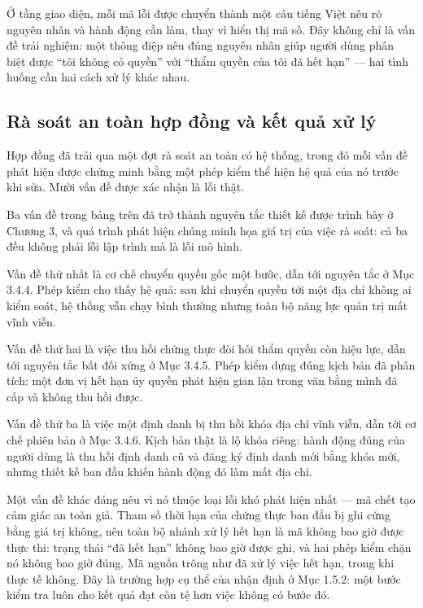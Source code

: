 Ở tầng giao diện, mỗi mã lỗi được chuyển thành một câu tiếng Việt nêu rõ nguyên nhân và hành động cần làm, thay vì hiển thị mã số. Đây không chỉ là vấn đề trải nghiệm: một thông điệp nêu đúng nguyên nhân giúp người dùng phân biệt được {``}tôi không có quyền{''} với {``}thẩm quyền của tôi đã hết hạn{''} --- hai tình huống cần hai cách xử lý khác nhau.

\subsection{Rà soát an toàn hợp đồng và kết quả xử lý}

Hợp đồng đã trải qua một đợt rà soát an toàn có hệ thống, trong đó mỗi vấn đề phát hiện được chứng minh bằng một phép kiểm thể hiện hệ quả của nó trước khi sửa. Mười vấn đề được xác nhận là lỗi thật.



Ba vấn đề trong bảng trên đã trở thành nguyên tắc thiết kế được trình bày ở Chương 3, và quá trình phát hiện chúng minh họa giá trị của việc rà soát: cả ba đều không phải lỗi lập trình mà là lỗi mô hình.

Vấn đề thứ nhất là cơ chế chuyển quyền gốc một bước, dẫn tới nguyên tắc ở Mục 3.4.4. Phép kiểm cho thấy hệ quả: sau khi chuyển quyền tới một địa chỉ không ai kiểm soát, hệ thống vẫn chạy bình thường nhưng toàn bộ năng lực quản trị mất vĩnh viễn.

Vấn đề thứ hai là việc thu hồi chứng thực đòi hỏi thẩm quyền còn hiệu lực, dẫn tới nguyên tắc bất đối xứng ở Mục 3.4.5. Phép kiểm dựng đúng kịch bản đã phân tích: một đơn vị hết hạn ủy quyền phát hiện gian lận trong văn bằng mình đã cấp và không thu hồi được.

Vấn đề thứ ba là việc một định danh bị thu hồi khóa địa chỉ vĩnh viễn, dẫn tới cơ chế phiên bản ở Mục 3.4.6. Kịch bản thật là lộ khóa riêng: hành động đúng của người dùng là thu hồi định danh cũ và đăng ký định danh mới bằng khóa mới, nhưng thiết kế ban đầu khiến hành động đó làm mất địa chỉ.

Một vấn đề khác đáng nêu vì nó thuộc loại lỗi khó phát hiện nhất --- mã chết tạo cảm giác an toàn giả. Tham số thời hạn của chứng thực ban đầu bị ghi cứng bằng giá trị không, nên toàn bộ nhánh xử lý hết hạn là mã không bao giờ được thực thi: trạng thái {``}đã hết hạn{''} không bao giờ được ghi, và hai phép kiểm chặn nó không bao giờ đúng. Mã nguồn trông như đã xử lý việc hết hạn, trong khi thực tế không. Đây là trường hợp cụ thể của nhận định ở Mục 1.5.2: một bước kiểm tra luôn cho kết quả đạt còn tệ hơn việc không có bước đó.

